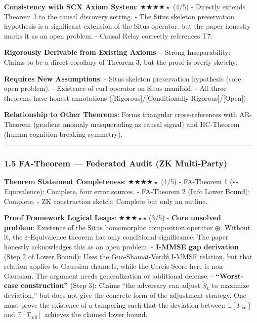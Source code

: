 \documentclass[
  12pt,
]{article}
\begin{document}
\textbf{Consistency with SCX Axiom System}: $\bigstar\bigstar\bigstar\bigstar{\scriptstyle\star}$ (4/5)
- Directly extends Theorem 3 to the causal discovery setting.
- The Situs skeleton preservation hypothesis is a significant extension of the Situs operator, but the paper honestly marks it as an open problem.
- Causal Relay correctly references T7.

\textbf{Rigorously Derivable from Existing Axioms}:
- Strong Inseparability: Claims to be a direct corollary of Theorem 3, but the proof is overly sketchy.

\textbf{Requires New Assumptions}:
- Situs skeleton preservation hypothesis (core open problem).
- Existence of curl operator on Situs manifold.
- All three theorems have honest annotations ([Rigorous]/[Conditionally Rigorous]/[Open]).

\textbf{Relationship to Other Theorems}: Forms triangular cross-references with AR-Theorem (gradient anomaly masquerading as causal signal) and HC-Theorem (human cognition breaking symmetry).

\begin{center}\rule{0.5\linewidth}{0.5pt}\end{center}

\subsubsection{1.5 FA-Theorem --- Federated Audit (ZK Multi-Party)}\label{fa-theorem-federated-audit-zk-multi-party}

\textbf{Theorem Statement Completeness}: $\bigstar\bigstar\bigstar\bigstar{\scriptstyle\star}$ (4/5)
- FA-Theorem 1 ($\varepsilon$-Equivalence): Complete, four error sources.
- FA-Theorem 2 (Info Lower Bound): Complete.
- ZK construction sketch: Complete but only an outline.

\textbf{Proof Framework Logical Leaps}: $\bigstar\bigstar\bigstar{\scriptstyle\star}{\scriptstyle\star}$ (3/5)
- \textbf{Core unsolved problem}: Existence of the Situs homomorphic composition operator $\oplus$. Without it, the $\varepsilon$-Equivalence theorem has only conditional significance. The paper honestly acknowledges this as an open problem.
- \textbf{I-MMSE gap derivation} (Step 2 of Lower Bound): Uses the Guo-Shamai-Verd\'{u} I-MMSE relation, but that relation applies to Gaussian channels, while the Cercis Score here is non-Gaussian. The argument needs generalization or additional defense.
- \textbf{``Worst-case construction''} (Step 3): Claims ``the adversary can adjust $\tilde{S}_k$ to maximize deviation,'' but does not give the concrete form of the adjustment strategy. One must prove the existence of a tampering such that the deviation between $\mathbb{E}[T_{\text{fed}}]$ and $\mathbb{E}[T_{\text{full}}]$ achieves the claimed lower bound.
\end{document}

